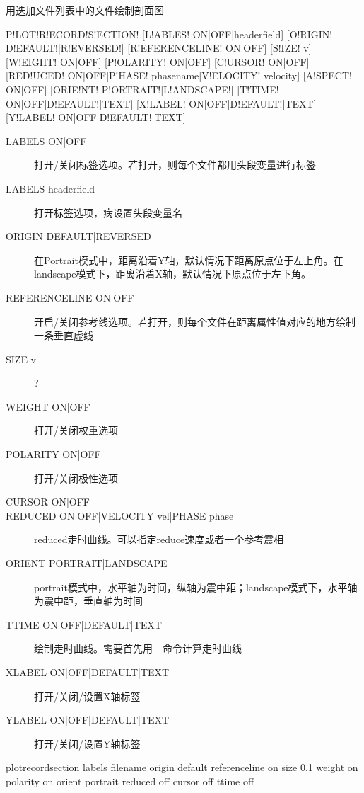 \label{sss:plotrecordsection}

用迭加文件列表中的文件绘制剖面图

\begin{SACSTX}
P!LOT!R!ECORD!S!ECTION! [L!ABLES! ON|OFF|headerfield]
    [O!RIGIN! D!EFAULT!|R!EVERSED!] [R!EFERENCELINE! ON|OFF] [S!IZE! v]
    [W!EIGHT! ON|OFF] [P!OLARITY! ON|OFF]
    [C!URSOR! ON|OFF] [RED!UCED! ON|OFF|P!HASE! phasename|V!ELOCITY! velocity]
    [A!SPECT! ON|OFF] [ORIE!NT! P!ORTRAIT!|L!ANDSCAPE!]
    [T!TIME! ON|OFF|D!EFAULT!|TEXT]
    [X!LABEL! ON|OFF|D!EFAULT!|TEXT] [Y!LABEL! ON|OFF|D!EFAULT!|TEXT]
\end{SACSTX}

\begin{description}
\item [LABELS ON|OFF] 打开/关闭标签选项。若打开，则每个文件都用头段变量进行标签
\item [LABELS headerfield] 打开标签选项，病设置头段变量名
\item [ORIGIN DEFAULT|REVERSED] 在Portrait模式中，距离沿着Y轴，默认情况下距离原点位于左上角。在landscape模式下，距离沿着X轴，默认情况下原点位于左下角。
\item [REFERENCELINE ON|OFF] 开启/关闭参考线选项。若打开，则每个文件在距离属性值对应的地方绘制一条垂直虚线
\item [SIZE v] ?
\item [WEIGHT ON|OFF] 打开/关闭权重选项
\item [POLARITY ON|OFF] 打开/关闭极性选项
\item [CURSOR ON|OFF]
\item [REDUCED ON|OFF|VELOCITY vel|PHASE phase] reduced走时曲线。可以指定reduce速度或者一个参考震相
\item [ORIENT PORTRAIT|LANDSCAPE] portrait模式中，水平轴为时间，纵轴为震中距；landscape模式下，水平轴为震中距，垂直轴为时间
\item [TTIME ON|OFF|DEFAULT|TEXT] 绘制走时曲线。需要首先用~~命令计算走时曲线
\item [XLABEL ON|OFF|DEFAULT|TEXT] 打开/关闭/设置X轴标签
\item [YLABEL ON|OFF|DEFAULT|TEXT] 打开/关闭/设置Y轴标签
\end{description}

\begin{SACDFT}
plotrecordsection labels filename origin default referenceline on
    size 0.1 weight on polarity on orient portrait reduced off
    cursor off ttime off
\end{SACDFT}


